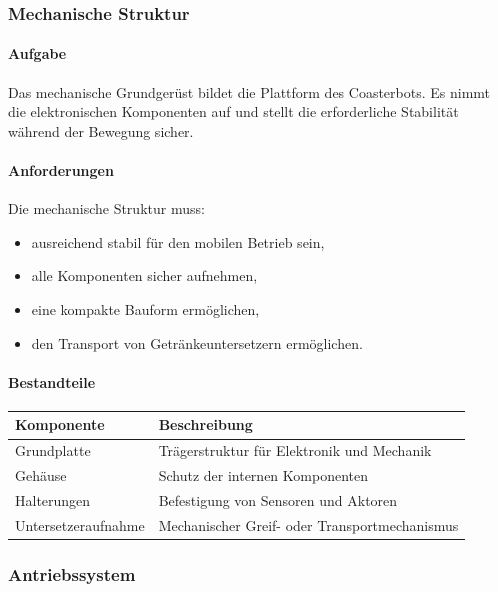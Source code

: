 \documentclass[
  a4paper,
  12pt,
  DIV=12,        %
  parskip=half,  %
  headings=small %
]{scrartcl}
\theoremstyle{definition}
\providecommand{\tightlist}{%
  \setlength{\itemsep}{0pt}\setlength{\parskip}{0pt}}
\theoremstyle{definition}
\begin{document}
\subsubsection{Mechanische Struktur}\label{mechanische-struktur}

\paragraph{Aufgabe}\label{aufgabe}

Das mechanische Grundgerüst bildet die Plattform des Coasterbots. Es
nimmt die elektronischen Komponenten auf und stellt die erforderliche
Stabilität während der Bewegung sicher.

\paragraph{Anforderungen}\label{anforderungen}

Die mechanische Struktur muss:

\begin{itemize}
\tightlist
\item
  ausreichend stabil für den mobilen Betrieb sein,
\item
  alle Komponenten sicher aufnehmen,
\item
  eine kompakte Bauform ermöglichen,
\item
  den Transport von Getränkeuntersetzern ermöglichen.
\end{itemize}

\paragraph{Bestandteile}\label{bestandteile}

\begin{longtable}[]{@{}ll@{}}
\toprule\noalign{}
Komponente & Beschreibung \\
\midrule\noalign{}
\endhead
\bottomrule\noalign{}
\endlastfoot
Grundplatte & Trägerstruktur für Elektronik und Mechanik \\
Gehäuse & Schutz der internen Komponenten \\
Halterungen & Befestigung von Sensoren und Aktoren \\
Untersetzeraufnahme & Mechanischer Greif- oder Transportmechanismus \\
\end{longtable}

\subsubsection{Antriebssystem}\label{antriebssystem}
\end{document}

